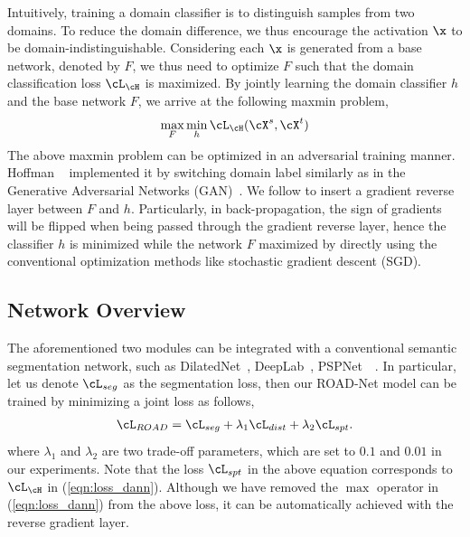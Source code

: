 \documentclass[10pt,twocolumn,letterpaper]{article}
\begin{document}
Intuitively, training a domain classifier is to distinguish samples from two domains. To reduce the domain difference, we thus encourage the activation $\x$ to be domain-indistinguishable. Considering each $\x$ is generated from a base network, denoted by $F$, we thus need to optimize $F$ such that the domain classification loss $\cL_{\cH}$ is maximized. By jointly learning the domain classifier $h$ and the base network $F$, we arrive at the following maxmin problem, 
\begin{eqnarray}
\label{eqn:loss_dann}
\max_{F}\min_{h} \cL_{\cH}(\cX^s, \cX^t)
\end{eqnarray}
The above maxmin problem can be optimized in an adversarial training manner. Hoffman \etal~\cite{hoffman2016fcns} implemented it by switching domain label similarly as in the Generative Adversarial Networks (GAN)~\cite{goodfellow2014generative}. We follow \cite{ganin2015unsupervised} to insert a gradient reverse layer between $F$ and $h$. Particularly, in back-propagation, the sign of gradients will be flipped when being passed through the gradient reverse layer, hence the classifier $h$ is minimized while the network $F$  maximized by directly using the conventional optimization methods like stochastic gradient descent (SGD). 

\subsection{Network Overview}

The aforementioned two modules can be integrated with a conventional semantic segmentation network, such as DilatedNet~\cite{yu2015multi}, DeepLab~\cite{chen2016deeplab}, PSPNet~\cite{zhao2016pyramid}~\etc. In particular, let us denote $\cL_{seg}$ as the segmentation loss, then our ROAD-Net model can be trained by minimizing a joint loss as follows, 
\begin{eqnarray}
\cL_{ROAD} = \cL_{seg} + \lambda_1 \cL_{dist} + \lambda_2\cL_{spt}. 
\end{eqnarray}
where $\lambda_1$ and $\lambda_2$ are two trade-off parameters, which are set to $0.1$ and $0.01$ in our experiments. Note that the loss $\cL_{spt}$ in the above equation corresponds to $\cL_{\cH}$ in (\ref{eqn:loss_dann}). Although we have removed the $\max$ operator in (\ref{eqn:loss_dann}) from the above loss, it can be automatically achieved with the reverse gradient layer. 
\end{document}
